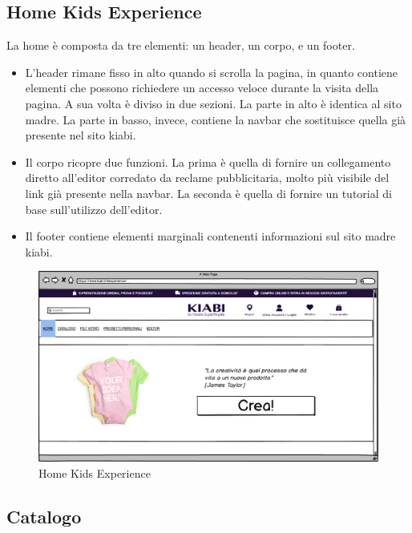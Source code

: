 \documentclass[12pt,italian,]{report}
\begin{document}
\newpage
\subsection{Home Kids Experience} 

La home è composta da tre elementi: un header, un corpo, e un footer.
\begin{itemize}
\item
L’header rimane fisso in alto quando si scrolla la pagina, in quanto contiene elementi che possono richiedere un accesso veloce durante la visita della pagina. 
A sua volta è diviso in due sezioni. La parte in alto è identica al sito madre. La parte in basso, invece, contiene la navbar che sostituisce quella già presente nel sito kiabi.

\item
Il corpo ricopre due funzioni. 
La prima è quella di fornire un collegamento diretto all'editor corredato da reclame pubblicitaria, molto più visibile del link già presente nella navbar. 
La seconda è quella di fornire un tutorial di base sull'utilizzo dell'editor.

\item Il footer contiene elementi marginali contenenti informazioni sul sito madre kiabi.
\end{itemize}

\begin{figure}[h]
\centering
\includegraphics{../../balsamiq/balsamiq_finale/HomeSottositoUtenteEsterno.png}
\caption{Home Kids Experience}
\label{kids_home}
\end{figure}




\subsection{Catalogo} 
\end{document}
